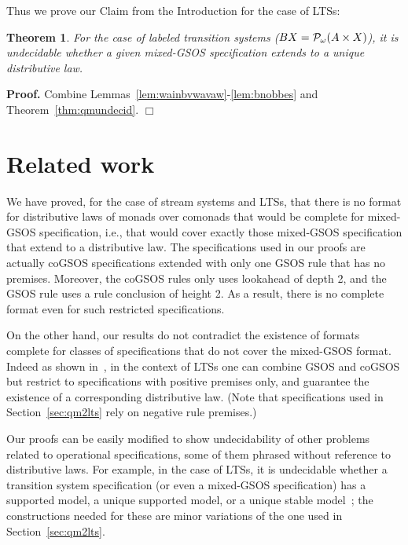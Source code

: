 \documentclass[adraft,copyright,creativecommons]{eptcs}
\newtheorem{theorem}{Theorem}
\newenvironment{proof}[1][Proof]{\noindent\textbf{#1.} }{{\hfill $\Box$ \\}}
\newcommand{\Pf}{{\cal P}_{\omega}}
\begin{document}
Thus we prove our Claim from the Introduction for the case of LTSs:

\begin{theorem}\label{thm:ltsundec}\rm
For the case of labeled transition systems ($BX=\Pf(A\times X)$),
it is undecidable whether a given mixed-GSOS specification extends to a unique distributive law.
\end{theorem}
\begin{proof}
Combine Lemmas~\ref{lem:wainbvwavaw}-\ref{lem:bnobbes} and Theorem~\ref{thm:qmundecid}.
\end{proof}

\section{Related work}\label{sec:related}

We have proved, for the case of stream systems and LTSs, that there is no format for distributive laws of monads over comonads that would be complete for mixed-GSOS specification, i.e., that would cover exactly those mixed-GSOS specification that extend to a distributive law. The specifications used in our proofs are actually coGSOS specifications extended with only one GSOS rule that has no premises. Moreover, the coGSOS rules only uses lookahead of depth 2, and the GSOS rule uses a rule conclusion of height 2. As a result, there is no complete format even for such restricted specifications.

On the other hand, our results do not contradict the existence of formats complete for classes of specifications that do not cover the mixed-GSOS format. Indeed as shown in~\cite{statontyft}, in the context of LTSs one can combine GSOS and coGSOS but restrict to specifications with positive premises only, and guarantee the existence of a corresponding distributive law. (Note that specifications used in Section~\ref{sec:qm2lts} rely on negative rule premises.)

Our proofs can be easily modified to show undecidability of other problems related to operational specifications, some of them phrased without reference to distributive laws. For example, in the case of LTSs, it is undecidable whether a transition system specification (or even a mixed-GSOS specification) has a supported model, a unique supported model, or a unique stable model~\cite{vGnegative}; the constructions needed for these are minor variations of the one used in Section~\ref{sec:qm2lts}.
\end{document}
